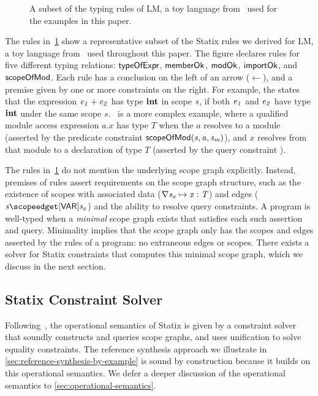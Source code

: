 \begin{figure}[t]
  
  \caption{
    A subset of the typing rules of LM, a toy language from~\cite{NeronTVW15} used for the examples in this paper.
  }%
  \label{fig:alg-minimod-rules}%
  \vspace{-0.5\baselineskip} %
\end{figure}

The rules in~\cref{fig:alg-minimod-rules} show a representative subset of the Statix rules we derived for LM, a toy language from~\cite{NeronTVW15} used throughout this paper.
The figure declares rules for five different typing relations: $\mathsf{typeOfExpr}$, $\mathsf{memberOk}$, $\mathsf{modOk}$, $\mathsf{importOk}$, and $\mathsf{scopeOfMod}$.
Each rule has a conclusion on the left of an arrow ($\leftarrow$), and a premise given by one or more constraints on the right.
For example, the  states that the expression $\mathit{e_1} + \mathit{e_2}$ has type $\mathbf{int}$ in scope $\mathit{s}$, if both $\mathit{e_1}$ and $\mathit{e_2}$ have type $\mathbf{int}$ under the same scope $s$.
~is a more complex example, where a qualified module access expression $a.x$ has type $T$ when the $a$ resolves to a module
(asserted by the predicate constraint $\mathsf{scopeOfMod}(\mathit{s}, \mathit{a}, \mathit{s_m})$),
and $x$ resolves from that module to a declaration of type $T$
(asserted by the query constraint ).

The rules in~\cref{fig:alg-minimod-rules} do not mention the underlying scope graph explicitly.
Instead, premises of rules assert requirements on the scope graph structure, such as the existence of scopes with associated data ($\nabla{\mathit{s_x}} \mapsto \mathit{x} : \mathit{T}$) and edges ($\svar{s} \cEdge[\lblVAR] \svar{s_x}$) and the ability to resolve query constraints.
A program is well-typed when a \emph{minimal} scope graph exists that satisfies each such assertion and query.
Minimality implies that the scope graph only has the scopes and edges asserted by the rules of a program: no extraneous edges or scopes.
There exists a solver for Statix constraints that computes this minimal scope graph, which we discuss in the next section.



\subsection{Statix Constraint Solver}%
\label{subsec:statix-constraint-solver}
Following~\citet{RouvoetAPKV20}, the operational semantics of Statix is given by
a constraint solver that soundly constructs and queries scope graphs, and uses unification to solve equality constraints.
The reference synthesis approach we illustrate in \cref{sec:reference-synthesis-by-example} is sound by construction because it builds on this operational semantics.
We defer a deeper discussion of the operational semantics to \cref{sec:operational-semantics}.

